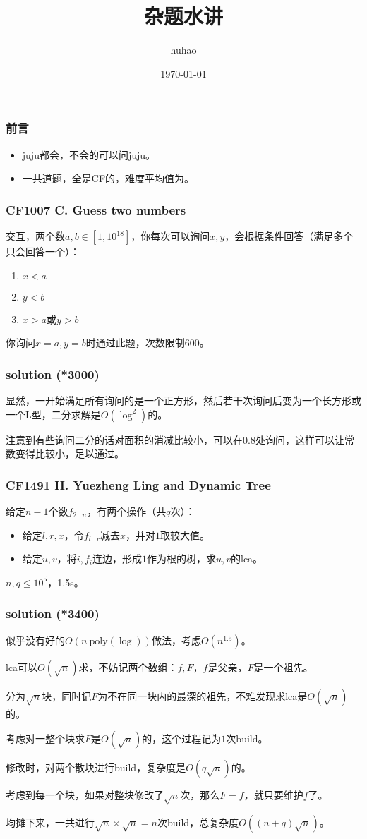 \documentclass[10pt]{beamer}
\begin{document}
	\title{杂题水讲}
	\date{\today}
	\author{huhao}
	\maketitle
	\clearpage
	\begin{frame}
		\frametitle{前言}
	
		\begin{itemize}
			\item juju都会，不会的可以问juju。
			\item 一共$ $道题，全是CF的，难度平均值为$ $。
		\end{itemize}
	
	\end{frame}
	\clearpage
	\begin{frame}
		\frametitle{CF1007 C. Guess two numbers}
		交互，两个数$a,b\in[1,10^{18}]$，你每次可以询问$x,y$，会根据条件回答（满足多个只会回答一个）：
		\begin{enumerate}
			\item $x<a$
			\item $y<b$
			\item $x>a$或$y>b$
		\end{enumerate}
		你询问$x=a,y=b$时通过此题，次数限制$600$。
	\end{frame}
	\clearpage
	\begin{frame}
		\frametitle{solution (*3000)}
	
		显然，一开始满足所有询问的是一个正方形，然后若干次询问后变为一个长方形或一个L型，二分求解是$O(\log^2)$的。

		注意到有些询问二分的话对面积的消减比较小，可以在$0.8$处询问，这样可以让常数变得比较小，足以通过。
	
	\end{frame}
	\clearpage
	\begin{frame}
		\frametitle{CF1491 H. Yuezheng Ling and Dynamic Tree}
		给定$n-1$个数$f_{2\dots n}$，有两个操作（共$q$次）：
		\begin{itemize}
			\item 给定$l,r,x$，令$f_{l\dots r}$减去$x$，并对$1$取较大值。
			\item 给定$u,v$，将$i,f_i$连边，形成$1$作为根的树，求$u,v$的lca。
		\end{itemize}
		$n,q\le 10^5$，1.5s。
	\end{frame}
	\clearpage
	\begin{frame}
		\frametitle{solution (*3400)}
	
		似乎没有好的$O(n~\mathrm{poly}(\log))$做法，考虑$O(n^{1.5})$。

		lca可以$O(\sqrt n)$求，不妨记两个数组：$f,F$，$f$是父亲，$F$是一个祖先。

		分为$\sqrt n$块，同时记$F$为不在同一块内的最深的祖先，不难发现求lca是$O(\sqrt n)$的。

		考虑对一整个块求$F$是$O(\sqrt n)$的，这个过程记为$1$次build。

		修改时，对两个散块进行build，复杂度是$O(q\sqrt n)$的。

		考虑到每一个块，如果对整块修改了$\sqrt n$次，那么$F=f$，就只要维护$f$了。

		均摊下来，一共进行$\sqrt n\times \sqrt n=n$次build，总复杂度$O((n+q)\sqrt n)$。
	
	\end{frame}
\end{document}
